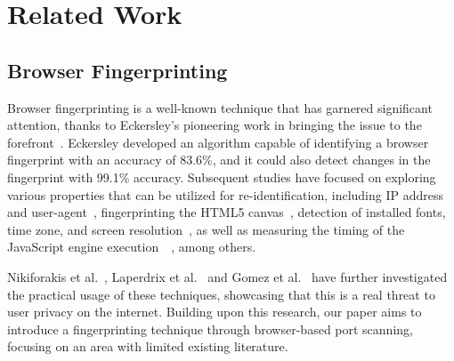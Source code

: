 \chapter{Related Work}





\section{Browser Fingerprinting}
\label{browser-fingerprinting}

Browser fingerprinting is a well-known technique that has garnered significant attention, thanks to Eckersley's pioneering work in bringing the issue to the forefront~\cite{eckersley2010}. Eckersley developed an algorithm capable of identifying a browser fingerprint with an accuracy of 83.6\%, and it could also detect changes in the fingerprint with 99.1\% accuracy. Subsequent studies have focused on exploring various properties that can be utilized for re-identification, including IP address and user-agent~\cite{yen2012}, fingerprinting the HTML5 canvas~\cite{mowery2012}, detection of installed fonts, time zone, and screen resolution~\cite{boda2012}, as well as measuring the timing of the JavaScript engine execution~\cite{mowery2011}~\cite{rokicki2021}, among others.

Nikiforakis et al.~\cite{nikiforakis2013}, Laperdrix et al.~\cite{laperdrix2016} and Gomez et al.~\cite{gomez2018} have further investigated the practical usage of these techniques, showcasing that this is a real threat to user privacy on the internet. Building upon this research, our paper aims to introduce a fingerprinting technique through browser-based port scanning, focusing on an area with limited existing literature.

